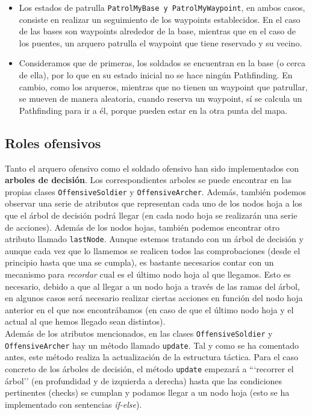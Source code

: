\begin{itemize}
 \item Los estados de patrulla \texttt{PatrolMyBase y PatrolMyWaypoint}, en ambos casos, consiste en realizar un seguimiento de los waypoints establecidos. En el caso de las bases son waypoints alrededor de la base, mientras que en el caso de los puentes, un arquero patrulla el waypoint que tiene reservado y su vecino.
 
 \item Consideramos que de primeras, los soldados se encuentran en la base (o cerca de ella), por lo que en su estado inicial no se hace ningún Pathfinding. En cambio, como los arqueros, mientras que no tienen un waypoint que patrullar, se mueven de manera aleatoria, cuando reserva un waypoint, sí se calcula un Pathfinding para ir a él, porque pueden estar en la otra punta del mapa.
\end{itemize}


\medskip
\subsection{Roles ofensivos}
Tanto el arquero ofensivo como el soldado ofensivo han sido implementados con \textbf{arboles de decisión}. Los correspondientes arboles se puede encontrar en las propias clases \texttt{OffensiveSoldier} y \texttt{OffensiveArcher}. Además, también podemos observar una serie de atributos que representan cada uno de los nodos hoja a los que el árbol de decisión podrá llegar (en cada nodo hoja se realizarán una serie de acciones). Además de los nodos hojas, también podemos encontrar otro atributo llamado \texttt{lastNode}. Aunque estemos tratando con un árbol de decisión y aunque cada vez que lo llamemos se realicen todos las comprobaciones (desde el principio hasta que una se cumpla), es bastante necesarios contar con un mecanismo para \textit{recordar} cual es el último nodo hoja al que llegamos. Esto es necesario, debido a que al llegar a un nodo hoja a través de las ramas del árbol, en algunos casos será necesario realizar ciertas acciones en función del nodo hoja anterior en el que nos encontrábamos (en caso de que el último nodo hoja y el actual al que hemos llegado sean distintos). \\

Además de los atributos mencionados, en las clases \texttt{OffensiveSoldier} y \texttt{OffensiveArcher} hay un método llamado \texttt{update}. Tal y como se ha comentado antes, este método realiza la actualización de la estructura táctica. Para el caso concreto de los árboles de decisión, el método \texttt{update} empezará a ```recorrer el árbol'' (en profundidad y de izquierda a derecha) hasta que las condiciones pertinentes (checks) se cumplan y podamos llegar a un nodo hoja (esto se ha implementado con sentencias \textit{if-else}). \\

